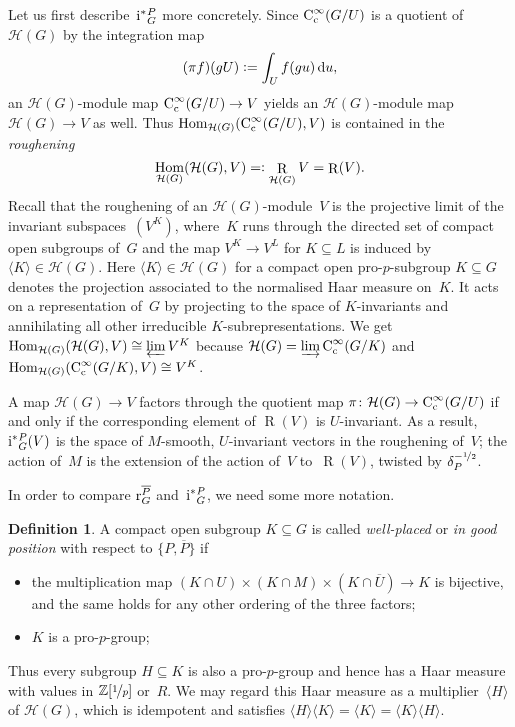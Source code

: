 \documentclass{amsart}
\theoremstyle{remark}
\theoremstyle{definition}
\newtheorem{definition}[theorem]{Definition}
\DeclareMathOperator{\Rough}{R}%
\DeclareMathOperator{\Hom}{Hom}%
\newcommand*{\Jact}{\textup i^*{}}%
\newcommand*{\Jacr}{\textup r}%
\newcommand*{\nb}{\nobreakdash}%
\newcommand*{\defeq}{\mathrel{\vcentcolon=}}%
\newcommand*{\eqdef}{\mathrel{=\vcentcolon}}%
\newcommand*{\idem}[1]{\langle#1\rangle}%
\newcommand*{\opp}[1]{\overline{#1}}%
\newcommand*{\Z}{\mathbb Z}%
\newcommand*{\Ccinf}[1][\infty]{\textup C_\textup c^{#1}}%
\newcommand*{\diff}{\textup d}%
\newcommand{\ring}{R}%
\newcommand*{\Hecke}{\mathcal H}%
\begin{document}
Let us first describe~\(\Jact_G^P\) more concretely.  Since \(\Ccinf(G/U)\) is a quotient of \(\Hecke(G)\) by the integration map
\[
(\pi f)(gU) \defeq \int_U f(gu)\,\diff u,
\]
an \(\Hecke(G)\)-module map \(\Ccinf(G/U)\to V\) yields an \(\Hecke(G)\)-module map \(\Hecke(G)\to V\) as well.  Thus \(\Hom_{\Hecke(G)}(\Ccinf(G/U),V)\) is contained in the \emph{roughening}
\[
\Hom_{\Hecke(G)}(\Hecke(G),V) \eqdef \Rough_{\Hecke(G)} V = \Rough (V).
\]
Recall that the roughening of an \(\Hecke(G)\)-module~\(V\) is the projective limit of the invariant subspaces~\((V^K)\), where~\(K\) runs through the directed set of compact open subgroups of~\(G\) and the map \(V^K\to V^L\) for \(K\subseteq L\) is induced by \(\idem{K}\in\Hecke(G)\).  Here \(\idem{K}\in\Hecke(G)\) for a compact open pro-\(p\)-subgroup \(K\subseteq G\) denotes the projection associated to the normalised Haar measure on~\(K\).  It acts on a representation of~\(G\) by projecting to the space of \(K\)\nb-invariants and annihilating all other irreducible \(K\)\nb-subrepresentations.  We get \(\Hom_{\Hecke(G)}(\Hecke(G),V) \cong \varprojlim V^K\) because \(\Hecke(G) = \varinjlim \Ccinf(G/K)\) and \(\Hom_{\Hecke(G)}(\Ccinf(G/K),V) \cong V^K\).

A map \(\Hecke(G)\to V\) factors through the quotient map \(\pi\colon \Hecke(G)\to\Ccinf(G/U)\) if and only if the corresponding element of \(\Rough(V)\) is \(U\)\nb-invariant.  As a result, \(\Jact_G^P(V)\) is the space of \(M\)\nb-smooth, \(U\)\nb-invariant vectors in the roughening of~\(V\); the action of~\(M\) is the extension of the action of~\(V\) to~\(\Rough(V)\), twisted by \(\delta_P^{-\nicefrac12}\).

In order to compare \(\Jacr_G^{\opp{P}}\) and~\(\Jact_G^P\), we need some more notation.

\begin{definition}
  \label{def:well-placed}
  A compact open subgroup \(K \subseteq G\) is called \emph{well-placed} or \emph{in good position} with respect to \(\{P,\opp{P}\}\) if
  \begin{itemize}
  \item the multiplication map \((K \cap U) \times (K \cap M) \times (K \cap \opp{U}) \to K\) is bijective, and the same holds for any other ordering of the three factors;
  \item \(K\) is a pro-\(p\)-group;
  \end{itemize}
\end{definition}

Thus every subgroup \(H \subseteq K\) is also a pro-\(p\)-group and hence has a Haar measure with values in \(\Z[\nicefrac1p]\) or~\(\ring\).  We may regard this Haar measure as a multiplier~\(\idem{H}\) of \(\Hecke(G)\), which is idempotent and satisfies \(\idem{H} \idem{K} = \idem{K} = \idem{K} \idem{H}\).
\end{document}
